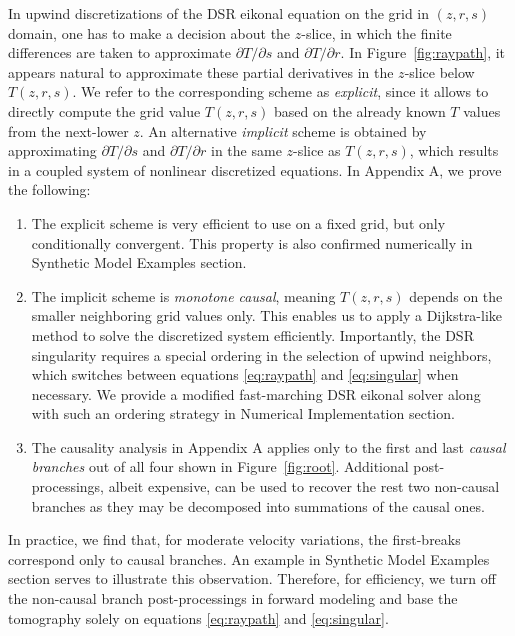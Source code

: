 In upwind discretizations of the DSR eikonal equation on the grid in $(z,r,s)$ domain, one has to make a decision 
about the $z$-slice, in which the finite differences are taken to approximate $\partial T / \partial s$ and 
$\partial T / \partial r$. In Figure~\ref{fig:raypath}, it appears natural to approximate these partial 
derivatives in the $z$-slice below $T (z,r,s)$. We refer to the corresponding scheme as \textit{explicit}, since 
it allows to directly compute the grid value $T (z,r,s)$ based on the already known $T$ values from the 
next-lower $z$. An alternative \textit{implicit} scheme is obtained by approximating $\partial T / \partial s$ 
and $\partial T / \partial r$ in the same $z$-slice as $T (z,r,s)$, which results in a coupled system of 
nonlinear discretized equations. In Appendix A, we prove the following:
\begin{enumerate}
\item The explicit scheme is very efficient to use on a fixed grid, but only conditionally convergent. 
This property is also confirmed numerically in Synthetic Model Examples section.
\item The implicit scheme is \textit{monotone causal}, meaning $T (z,r,s)$ depends on the smaller neighboring 
grid values only. This enables us to apply a Dijkstra-like method \cite[]{dijkstra} to solve the discretized 
system efficiently. Importantly, the DSR singularity requires a special ordering in the selection of upwind 
neighbors, which switches between equations \ref{eq:raypath} and \ref{eq:singular} when necessary. We provide a 
modified fast-marching \cite[]{sethian} DSR eikonal solver along with such an ordering strategy in Numerical 
Implementation section.
\item The causality analysis in Appendix A applies only to the first and last \textit{causal branches} out of all 
four shown in Figure~\ref{fig:root}. Additional post-processings, albeit expensive, can be used to recover the 
rest two non-causal branches as they may be decomposed into summations of the causal ones.
\end{enumerate}

In practice, we find that, for moderate velocity variations, the first-breaks correspond only to causal branches. 
An example in Synthetic Model Examples section serves to illustrate this observation. Therefore, for 
efficiency, we turn off the non-causal branch post-processings in forward modeling and base the 
tomography solely on equations \ref{eq:raypath} and \ref{eq:singular}.

